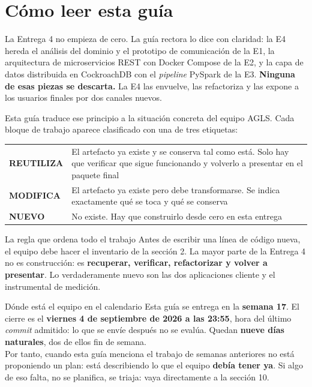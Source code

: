 \documentclass[11pt,a4paper]{article}
\newcommand{\reuso}{\cellcolor{filaReuso}\textbf{REUTILIZA}}
\newcommand{\cambia}{\cellcolor{filaCambia}\textbf{MODIFICA}}
\newcommand{\nuevo}{\cellcolor{filaNuevo}\textbf{NUEVO}}
\begin{document}
\tableofcontents
\newpage

\section{Cómo leer esta guía}

La Entrega 4 no empieza de cero. La guía rectora lo dice con claridad: la E4 hereda el análisis del dominio y el prototipo de comunicación de la E1, la arquitectura de microservicios REST con Docker Compose de la E2, y la capa de datos distribuida en CockroachDB con el \emph{pipeline} PySpark de la E3. \textbf{Ninguna de esas piezas se descarta.} La E4 las envuelve, las refactoriza y las expone a los usuarios finales por dos canales nuevos.

Esta guía traduce ese principio a la situación concreta del equipo AGLS. Cada bloque de trabajo aparece clasificado con una de tres etiquetas:

\begin{center}
	\small
	\begin{tabular}{@{}p{2.6cm}p{12.6cm}@{}}
		\toprule
		\reuso & El artefacto ya existe y se conserva tal como está. Solo hay que verificar que sigue funcionando y volverlo a presentar en el paquete final \\
		\addlinespace
		\cambia & El artefacto ya existe pero debe transformarse. Se indica exactamente qué se toca y qué se conserva \\
		\addlinespace
		\nuevo & No existe. Hay que construirlo desde cero en esta entrega \\
		\bottomrule
	\end{tabular}
\end{center}

\begin{uteqbox}{La regla que ordena todo el trabajo}
	Antes de escribir una línea de código nueva, el equipo debe hacer el inventario de la sección 2. La mayor parte de la Entrega 4 no es construcción: es \textbf{recuperar, verificar, refactorizar y volver a presentar}. Lo verdaderamente nuevo son las dos aplicaciones cliente y el instrumental de medición.
\end{uteqbox}

\begin{pisoBox}{Dónde está el equipo en el calendario}
	Esta guía se entrega en la \textbf{semana 17}. El cierre es el \textbf{viernes 4 de septiembre de 2026 a las 23:55}, hora del último \emph{commit} admitido: lo que se envíe después no se evalúa. Quedan \textbf{nueve días naturales}, dos de ellos fin de semana.\\[5pt]
	Por tanto, cuando esta guía menciona el trabajo de semanas anteriores no está proponiendo un plan: está describiendo lo que el equipo \textbf{debía tener ya}. Si algo de eso falta, no se planifica, se triaja: vaya directamente a la sección 10.
\end{pisoBox}
\end{document}
